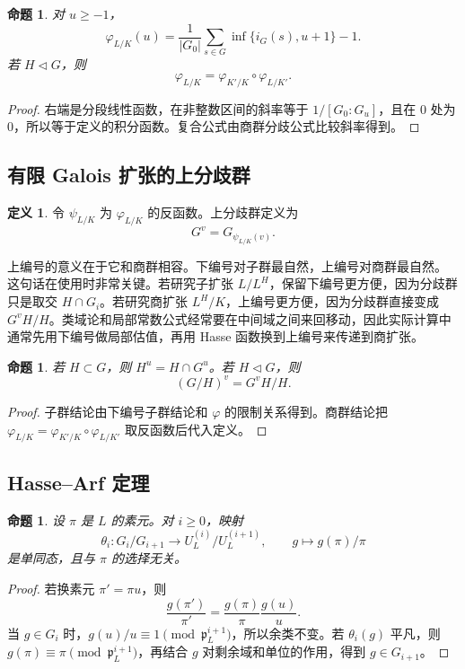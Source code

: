 \documentclass[11pt,a4paper,openany]{ctexbook}
\numberwithin{equation}{chapter}
\theoremstyle{plain}
\newtheorem{proposition}[theorem]{命题}
\theoremstyle{definition}
\newtheorem{definition}[theorem]{定义}
\theoremstyle{remark}
\begin{document}
\begin{proposition}
对 $u\ge -1$，
\[
  \varphi_{L/K}(u)=\frac1{|G_0|}\sum_{s\in G}\inf\{i_G(s),u+1\}-1.
\]
若 $H\triangleleft G$，则
\[
  \varphi_{L/K}=\varphi_{K'/K}\circ\varphi_{L/K'}.
\]
\end{proposition}

\begin{proof}
右端是分段线性函数，在非整数区间的斜率等于 $1/[G_0:G_u]$，且在 $0$ 处为 $0$，所以等于定义的积分函数。复合公式由商群分歧公式比较斜率得到。
\end{proof}

\subsection{有限 Galois 扩张的上分歧群}

\begin{definition}
令 $\psi_{L/K}$ 为 $\varphi_{L/K}$ 的反函数。上分歧群定义为
\[
  G^v=G_{\psi_{L/K}(v)}.
\]
\end{definition}

上编号的意义在于它和商群相容。下编号对子群最自然，上编号对商群最自然。
这句话在使用时非常关键。若研究子扩张 $L/L^H$，保留下编号更方便，因为分歧群只是取交 $H\cap G_i$。若研究商扩张 $L^H/K$，上编号更方便，因为分歧群直接变成 $G^vH/H$。类域论和局部常数公式经常要在中间域之间来回移动，因此实际计算中通常先用下编号做局部估值，再用 Hasse 函数换到上编号来传递到商扩张。

\begin{proposition}
若 $H\subset G$，则 $H^u=H\cap G^u$。若 $H\triangleleft G$，则
\[
  (G/H)^v=G^vH/H.
\]
\end{proposition}

\begin{proof}
子群结论由下编号子群结论和 $\varphi$ 的限制关系得到。商群结论把 $\varphi_{L/K}=\varphi_{K'/K}\circ\varphi_{L/K'}$ 取反函数后代入定义。
\end{proof}

\subsection{Hasse--Arf 定理}

\begin{proposition}
设 $\pi$ 是 $L$ 的素元。对 $i\ge0$，映射
\[
  \theta_i:G_i/G_{i+1}\longrightarrow U_L^{(i)}/U_L^{(i+1)},\qquad
  g\mapsto g(\pi)/\pi
\]
是单同态，且与 $\pi$ 的选择无关。
\end{proposition}

\begin{proof}
若换素元 $\pi'=\pi u$，则
\[
  \frac{g(\pi')}{\pi'}=\frac{g(\pi)}{\pi}\frac{g(u)}u.
\]
当 $g\in G_i$ 时，$g(u)/u\equiv1\pmod{\mathfrak p_L^{i+1}}$，所以余类不变。若 $\theta_i(g)$ 平凡，则 $g(\pi)\equiv\pi\pmod{\mathfrak p_L^{i+1}}$，再结合 $g$ 对剩余域和单位的作用，得到 $g\in G_{i+1}$。
\end{proof}
\end{document}
